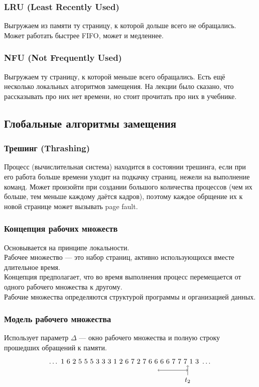 \documentclass[12pt, a4paper]{article}
\begin{document}
    \subsubsection{LRU (Least Recently Used)}
    Выгружаем из памяти ту страницу, к которой дольше всего не обращались.\\
    Может работать быстрее FIFO, может и медленнее.
    \subsubsection{NFU (Not Frequently Used)}
    Выгружаем ту страницу, к которой меньше всего обращались.
    Есть ещё несколько локальных алгоритмов замещения. На лекции было сказано, что рассказывать про них нет времени, но стоит прочитать про них в учебнике.
    \subsection{Глобальные алгоритмы замещения}
    \subsubsection{Трешинг (Thrashing)}
    Процесс (вычислительная система) находится в состоянии трешинга, если при его работа больше времени уходит на подкачку страниц, нежели на выполнение команд. Может произойти при создании большого количества процессов (чем их больше, тем меньше каждому даётся кадров), поэтому каждое обрщение их к новой странице может вызывать page fault.
    \subsubsection{Концепция рабочих множеств}
    Основывается на принципе локальности.\\
    Рабочее множество --- это набор страниц, активно использующихся вместе длительное время.\\
    Концепция предполагает, что во время выполнения процесс перемещается от одного рабочего множества к другому.\\
    Рабочие множества определяются структурой программы и организацией данных.
    \subsubsection{Модель рабочего множества}
    Использует параметр $\Delta$ --- окно рабочего множества и полную строку прошедших обращений к памяти.
    \[\begin{tikzpicture}
        \draw (0, 0) node{$\dots\ 1\ 6\ 2\ 5\ 5\ 5\ 3\ 3\ 3\ 1\ 2\ 6\  7\ 2\ 7\ 6\ 6\ 6\ 6\ 7\ 7\ 7\ 1\ 3\ \dots$};
        \draw[->] (2.87, -0.7) node[anchor=north]{$t_2$} -- (2.87, -0.2);
        \draw[<->] (1.37, -0.45) -- (2.87, -0.45);
    \end{tikzpicture}\]
\end{document}
